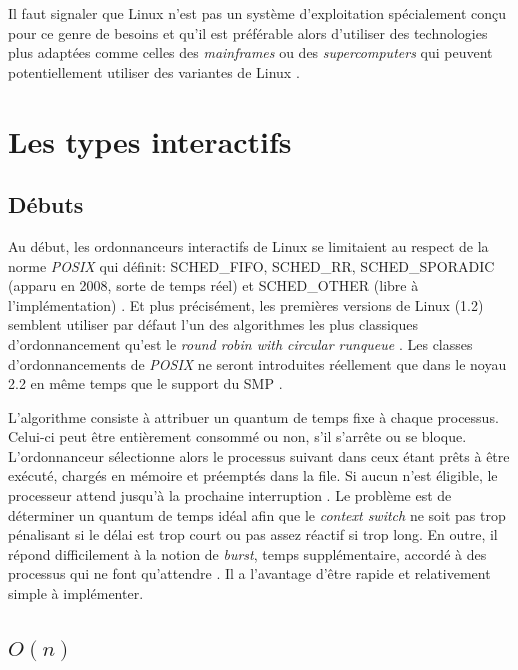 \documentclass[letterpaper]{article}
\begin{document}
Il faut signaler que Linux n'est pas un système d'exploitation spécialement conçu pour ce genre de besoins et qu'il est préférable alors d'utiliser des technologies plus adaptées comme celles des \textit{mainframes} ou des \textit{supercomputers} qui peuvent potentiellement utiliser des variantes de Linux \citep{Encyclopedia:2011}.

\section{Les types interactifs}

\subsection{Débuts}

Au début, les ordonnanceurs interactifs de Linux se limitaient au respect de la norme \textit{POSIX} qui définit: SCHED\_FIFO, SCHED\_RR, SCHED\_SPORADIC (apparu en 2008, sorte de temps réel) et SCHED\_OTHER (libre à l'implémentation) \citep{6506091}. Et plus précisément, les premières versions de Linux (1.2) semblent utiliser par défaut l'un des algorithmes les plus classiques d'ordonnancement qu'est le \textit{round robin with circular runqueue} \citep{Maxwell:1999:LCK:519502, Beck:1996:LKI:547935}. Les classes d'ordonnancements de \textit{POSIX} ne seront introduites réellement que dans le noyau 2.2 en même temps que le support du SMP \citep{ScalableLinuxScheduling}.

L'algorithme consiste à attribuer un quantum de temps fixe à chaque processus. Celui-ci peut être entièrement consommé ou non, s'il s'arrête ou se bloque. L'ordonnanceur sélectionne alors le processus suivant dans ceux étant prêts à être exécuté, chargés en mémoire et préemptés dans la file. Si aucun n'est éligible, le processeur attend jusqu'à la prochaine interruption \citep{corbato1962experimental}. Le problème est de déterminer un quantum de temps idéal afin que le \textit{context switch} ne soit pas trop pénalisant si le délai est trop court ou pas assez réactif si trop long. En outre, il répond difficilement à la notion de \textit{burst}, temps supplémentaire, accordé à des processus qui ne font qu'attendre \citep{Bach:1986:DUO:8570}. Il a l'avantage d'être rapide et relativement simple à implémenter.

\subsection{$O(n)$}
\end{document}
